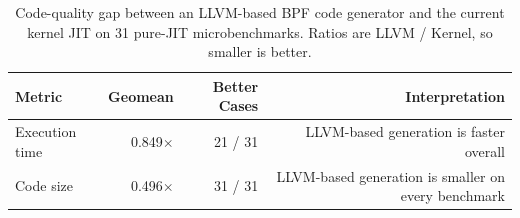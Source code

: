 \begin{table}[t]
  \centering
  \caption{Code-quality gap between an LLVM-based BPF code generator and the current kernel JIT on 31 pure-JIT microbenchmarks. Ratios are LLVM / Kernel, so smaller is better.}
  \label{tab:motivation_gap_summary}
  \small
  \begin{tabular}{lrrr}
    \toprule
    Metric & Geomean & Better Cases & Interpretation \\
    \midrule
    Execution time & 0.849$\times$ & 21 / 31 & LLVM-based generation is faster overall \\
    Code size      & 0.496$\times$ & 31 / 31 & LLVM-based generation is smaller on every benchmark \\
    \bottomrule
  \end{tabular}
\end{table}
